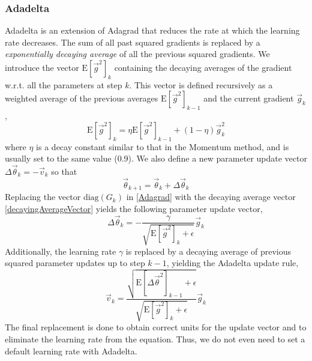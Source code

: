 \documentclass[twoside,english]{uiofysmaster}
\begin{document}
\subsubsection{Adadelta}
Adadelta \cite{Zeiler12} is an extension of Adagrad that reduces the rate at which the learning rate decreases. 
The sum of all past squared gradients is replaced by a \textit{exponentially decaying average} of all the previous squared gradients.
We introduce the vector $\mathrm{E}[\vec{g}^2]_k$ containing the decaying averages of the gradient w.r.t. all the parameters at step $k$. 
This vector is defined recursively
as a weighted average of the previous averages $\mathrm{E}[\vec{g}^2]_{k-1}$ and the current gradient $\vec{g}_k$,
\begin{equation}
 \mathrm{E}[\vec{g}^2]_k = \eta \mathrm{E}[\vec{g}^2]_{k-1} + (1 - \eta) \vec{g}^2_k
 \label{decayingAverageVector}
\end{equation}
where $\eta$ is a decay constant similar to that in the Momentum method, and is usually set to the same value (0.9). 
We also define a new parameter update vector $\Delta \vec{\theta}_k = -\vec{v}_k$ so that
\begin{equation}
 \vec{\theta}_{k+1} = \vec{\theta}_k  + \Delta \vec{\theta}_k
\end{equation}
Replacing the vector $\mathrm{diag}(G_k)$ in \eqref{Adagrad} with the decaying average vector \eqref{decayingAverageVector}
yields the following parameter update vector,
\begin{equation}
 \Delta \vec{\theta}_k = -\frac{\gamma}{\sqrt{\mathrm{E}[\vec{g}^2]_k + \epsilon}} \vec{g}_k
 \label{preliminiaryAdadelta}
\end{equation}
Additionally, the learning rate $\gamma$ is replaced by a decaying average of previous squared parameter updates
up to step $k-1$, yielding the Adadelta update rule,
\begin{equation}
 \vec{v}_k = \frac{\sqrt{\mathrm{E}[\Delta\vec{\theta}^2]_{k-1} + \epsilon}}{\sqrt{\mathrm{E}[\vec{g}^2]_k + \epsilon}} \vec{g}_k
\end{equation}
The final replacement is done to obtain correct units for the update vector and to eliminate the learning rate from the equation. 
Thus, we do not even need to set a default learning rate with Adadelta. 
\end{document}
